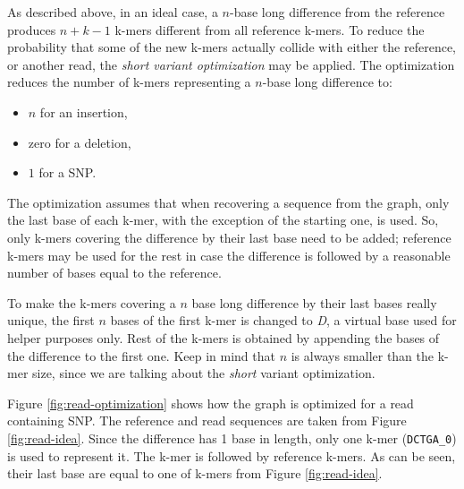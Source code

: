 As described above, in an ideal case, a $n$-base long difference from the reference produces $n + k - 1$ k-mers different from all reference k-mers. To reduce the probability that some of the new k-mers actually collide with either the reference, or another read, the \textit{short variant optimization} may be applied. The optimization reduces the number of k-mers representing a $n$-base long difference to:
\begin{itemize}
\item $n$ for an insertion,
\item zero for a deletion,
\item $1$ for a SNP.
\end{itemize}
The optimization assumes that when recovering a sequence from the graph, only the last base of each k-mer, with the exception of the starting one, is used. So, only k-mers covering the difference by their last base need to be added; reference k-mers may be used for the rest in case the difference is followed by a reasonable number of bases equal to the reference. 

To make the k-mers covering a $n$ base long difference by their last bases really unique, the first $n$ bases of the first k-mer is changed to \textit{D}, a virtual base used for helper purposes only. Rest of the k-mers is obtained by appending the bases of the difference to the first one. Keep in mind that $n$ is always smaller than the k-mer size, since we are talking about the \textit{short} variant optimization.

Figure \ref{fig:read-optimization} shows how the graph is optimized for a read containing SNP. The reference and read sequences are taken from Figure \ref{fig:read-idea}. Since the difference has 1 base in length, only one k-mer (\texttt{DCTGA\_0}) is used to represent it. The k-mer is followed by reference k-mers. As can be seen, their last base are equal to one of k-mers from Figure \ref{fig:read-idea}.

